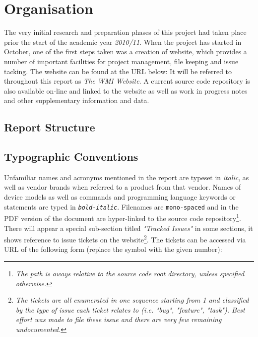 
\section{Organisation}

  The very initial research and preparation phases of this project had taken place
 prior the start of the academic year \emph{2010/11}. When the project has started
 in October, one of the first steps taken was a creation of website, which provides
 a number of important facilities for project management, file keeping and issue
 tacking. The website can be found at the URL below:
 {}
 It will be referred to throughout this report as \emph{The WMI Website}. A current
 source code repository is also available on-line and linked to the website as well
 as work in progress notes and other supplementary information and data.

\subsection{Report Structure}

\subsection{Typographic Conventions}

  Unfamiliar names and acronyms mentioned in the report are typeset in \emph{italic},
 as well as vendor brands when referred to a product from that vendor. Names of device
 models as well as commands and programming language keywords or statements are typed
 in \emph{\texttt{bold-italic}}. Filenames are \texttt{mono-spaced} and in the PDF
 version of the document are hyper-linked to the source code repository\footnote{%
 \emph{The path is aways relative to the source code root directory, unless specified
 otherwise.}}. There will appear a special sub-section titled \emph{"Tracked Issues"}
 in some sections, it shows reference to issue tickets on the website\footnote{\emph{%
 The tickets are all enumerated in one sequence starting from 1 and classified by the
 type of issue each ticket relates to (i.e. "bug", "feature", "task"). Best effort
 was made to file these issue and there are very few remaining undocumented.}}.
 The tickets can be accessed via URL of the following form (replace the 
 symbol with the given number): 
